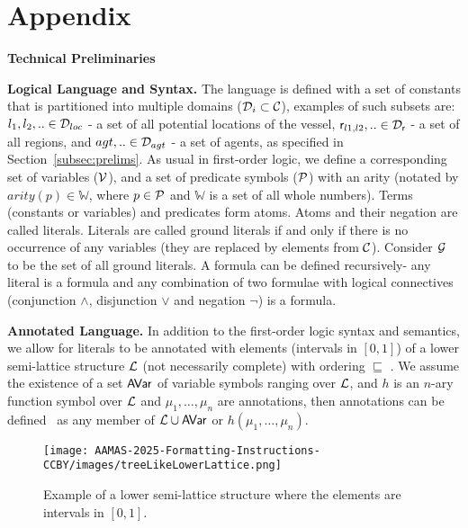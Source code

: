 \appendix
% 

\section{Appendix}{\bf Technical Preliminaries}

\noindent\textbf{Logical Language and Syntax.} The language is defined with a set of constants that is partitioned into multiple domains ($\mathcal{D}_i \subset \mathcal{C}$),
examples of such subsets are: $l_1, l_2,.. \in \mathcal{D}_{loc}$ - a set of all potential locations of the vessel, $\textsf{r}_{l1,l2},.. \in \mathcal{D}_{\textsf{r}}$ - a set of all regions, and $agt,.. \in \mathcal{D}_{agt}$ - a set of agents, as specified in Section~\ref{subsec:prelims}.
As usual in first-order logic, we define a corresponding set of variables ($\mathcal{V}$), and a set of predicate symbols ($\mathcal{P}$) with an 
arity (notated by $arity(p) \in \mathbb{W} $, where $p \in  \mathcal{P}$ and $\mathbb{W}$ is a set of all whole numbers).
Terms (constants or variables) and predicates form atoms. Atoms and their negation are called literals. Literals are called ground literals if and only if there is no occurrence of any variables (they are replaced by elements from $\mathcal{C}$). Consider $\mathcal{G}$ to be the set of all ground literals. A formula can be defined recursively- any literal is a formula and any combination of two formulae with logical connectives (conjunction $\wedge$, disjunction $\vee$ and negation $\neg$) is a formula.

\noindent\textbf{Annotated Language.} In addition to the first-order logic syntax and semantics, we allow for literals to be annotated with elements (intervals in $[0,1]$) of a lower semi-lattice structure  $\mathcal{L}$ (not necessarily complete) with ordering $\sqsubseteq$ \cite{ks92,ssTAI22}. 
We assume the existence of a set $\textsf{AVar}$ of variable symbols ranging over $\mathcal{L}$, and $h$ is an $n$-ary function symbol over $\mathcal{L}$ and $\mu_1,\ldots,\mu_n$ are annotations, then annotations can be defined~\cite{ssTAI22, ks92} as any member of $\mathcal{L} \cup \textsf{AVar}$ or $h(\mu_1,\ldots,\mu_n)$.
\begin{figure*}[!t]
    \begin{center}
        \texttt{[image: AAMAS-2025-Formatting-Instructions-CCBY/images/treeLikeLowerLattice.png]}
    \end{center}
    \caption{\label{fig:lowerLattice}Example of a lower semi-lattice structure where the elements are intervals in $[0,1]$.}
\end{figure*}



